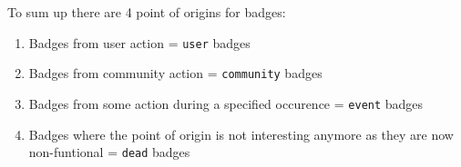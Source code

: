 \documentclass[]{book}
\providecommand{\tightlist}{%
  \setlength{\itemsep}{0pt}\setlength{\parskip}{0pt}}
\theoremstyle{definition}
\theoremstyle{definition}
\theoremstyle{definition}
\theoremstyle{remark}
\begin{document}
To sum up there are 4 point of origins for badges:

\begin{enumerate}
\def\labelenumi{\arabic{enumi})}
\tightlist
\item
  Badges from user action = \texttt{user} badges
\item
  Badges from community action = \texttt{community} badges
\item
  Badges from some action during a specified occurence = \texttt{event}
  badges
\item
  Badges where the point of origin is not interesting anymore as they
  are now non-funtional = \texttt{dead} badges
\end{enumerate}

\begin{landscape}


\end{landscape}
\end{document}
